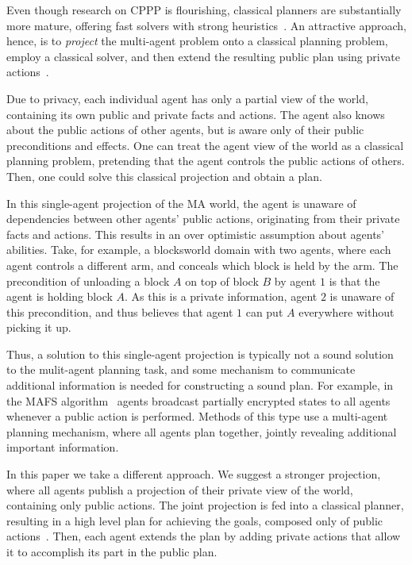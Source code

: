 \documentclass[letterpaper]{article}
\theoremstyle{definition}
\begin{document}
Even though research on CPPP is flourishing, classical planners are substantially more mature, offering fast solvers with strong heuristics~\cite{hoffmann2001ff,helmert2009landmarks}. An attractive approach, hence, is to {\em project} the multi-agent problem onto a classical planning problem,  employ a classical solver, and then extend the resulting public plan using private actions~\cite{brafman2008one}.

Due to privacy, each individual agent has only a partial view of the world, containing its own public and private facts and actions. The agent also knows about the public actions of other agents, but is aware only of their public preconditions and effects. One can treat the agent view of the world as a classical planning problem, pretending that the agent controls the public actions of others. Then, one could solve this classical projection and obtain a plan.

In this single-agent projection of the MA world, the agent is unaware of dependencies between other agents' public actions, originating from their private facts and actions. This results in an over optimistic assumption about agents' abilities. Take, for example, a blocksworld domain with two agents, where each agent controls a different arm, and conceals which block is held by the arm. The precondition of unloading a block $A$ on top of block $B$
by agent $1$ is that the agent is holding block $A$. As this is a private information, agent $2$ is unaware of this precondition, and thus believes that agent $1$ can put $A$ everywhere without picking it up.



Thus, a solution to this single-agent projection is typically not a sound solution to the mulit-agent planning task, and some mechanism to communicate additional information is needed for constructing a sound plan. For example, in the MAFS algorithm~\cite{nissim2014distributed} agents broadcast partially encrypted states to all agents whenever a public action is performed. Methods of this type use a multi-agent planning mechanism, where all agents plan together, jointly revealing additional important information.

In this paper we take a different approach. We suggest a stronger projection, where all agents publish a projection of their private view of the world, containing only public actions. The joint projection is fed into a classical planner, resulting in a high level plan for achieving the goals, composed only of public actions~\cite{brafman2008one,maliah2014privacyPreserving}. Then, each agent extends the plan by adding private actions that allow it to accomplish its part in the public plan.
\end{document}
